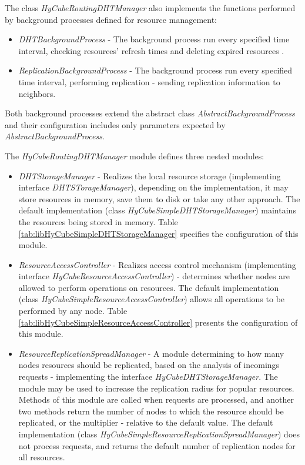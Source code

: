 The class \emph{HyCubeRoutingDHTManager} also implements the functions performed by background processes defined for resource management:

\begin{itemize}
	\renewcommand{\labelitemi}{$\bullet$}
	\item \emph{DHTBackgroundProcess} - The background process run every specified time interval, checking resources' refresh times and deleting expired resources .
	\item \emph{ReplicationBackgroundProcess} - The background process run every specified time interval, performing replication - sending replication information to neighbors.
\end{itemize}

\noindent
Both background processes extend the abstract class \emph{AbstractBackgroundProcess} and their configuration includes only parameters expected by \emph{AbstractBackgroundProcess}.


The \emph{HyCubeRoutingDHTManager} module defines three nested modules:

\begin{itemize}
	\renewcommand{\labelitemi}{$\bullet$}
	\item \emph{DHTStorageManager} - Realizes the local resource storage (implementing interface \emph{DHTSTorageManager}), depending on the implementation, it may store resources in memory, save them to disk or take any other approach. The default implementation (class \emph{HyCubeSimpleDHTStorageManager}) maintains the resources being stored in memory. Table \ref{tab:libHyCubeSimpleDHTStorageManager} specifies the configuration of this module.

	\item \emph{ResourceAccessController} - Realizes access control mechanism (implementing interface \emph{HyCubeResourceAccessController}) - determines whether nodes are allowed to perform operations on resources. The default implementation (class \emph{HyCubeSimpleResourceAccessController}) allows all operations to be performed by any node. Table \ref{tab:libHyCubeSimpleResourceAccessController} presents the configuration of this module.

	\item \emph{ResourceReplicationSpreadManager} - A module determining to how many nodes resources should be replicated, based on the analysis of incomings requests - implementing the interface \emph{HyCubeDHTStorageManager}. The module may be used to increase the replication radius for popular resources. Methods of this module are called when requests are processed, and another two methods return the number of nodes to which the resource should be replicated, or the multiplier - relative to the default value. The default implementation (class \emph{HyCubeSimpleResourceReplicationSpreadManager}) does not process requests, and returns the default number of replication nodes for all resources.

\end{itemize}






